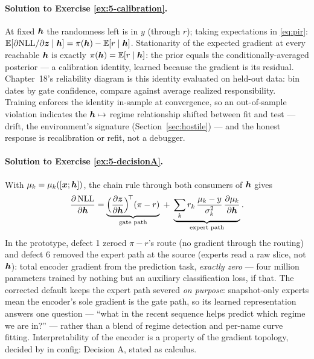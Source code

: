 \paragraph{Solution to Exercise \ref{ex:5-calibration}.}
At fixed $\bm{h}$ the randomness left is in $y$ (through $r$); taking
expectations in \eqref{eq:pir}: $\mathbb{E}[\partial \mathrm{NLL}/\partial \bm{z} \mid
\bm{h}] = \pi(\bm{h}) - \mathbb{E}[r \mid \bm{h}]$. Stationarity of the expected
gradient at every reachable $\bm{h}$ is exactly $\pi(\bm{h}) = \mathbb{E}[r \mid
\bm{h}]$: the prior equals the conditionally-averaged posterior --- a
calibration identity, learned because the gradient is its residual.
Chapter~18's reliability diagram is this identity evaluated on held-out
data: bin dates by gate confidence, compare against average realized
responsibility. Training enforces the identity in-sample at
convergence, so an out-of-sample violation indicates the
$\bm{h} \mapsto$ regime relationship shifted between fit and test ---
drift, the environment's signature (Section~\ref{sec:hostile}) --- and
the honest response is recalibration or refit, not a debugger.

\paragraph{Solution to Exercise \ref{ex:5-decisionA}.}
With $\mu_k = \mu_k([\bm{x}; \bm{h}])$, the chain rule through both consumers
of $\bm{h}$ gives
\[
  \frac{\partial\,\mathrm{NLL}}{\partial \bm{h}}
  = \underbrace{\Bigl(\frac{\partial \bm{z}}{\partial \bm{h}}\Bigr)^{\!\top}
    (\pi - r)}_{\text{gate path}}
  \;+\;
  \underbrace{\sum_k r_k\, \frac{\mu_k - y}{\sigma_k^2}\,
    \frac{\partial \mu_k}{\partial \bm{h}}}_{\text{expert path}} .
\]
In the prototype, defect 1 zeroed $\pi - r$'s route (no gradient through
the routing) and defect 6 removed the expert path at the source (experts
read a raw slice, not $\bm{h}$): total encoder gradient from the prediction
task, \emph{exactly zero} --- four million parameters trained by nothing
but an auxiliary classification loss, if that. The corrected default
keeps the expert path severed \emph{on purpose}: snapshot-only experts
mean the encoder's sole gradient is the gate path, so its learned
representation answers one question --- ``what in the recent sequence
helps predict which regime we are in?'' --- rather than a blend of
regime detection and per-name curve fitting. Interpretability of the
encoder is a property of the gradient topology, decided by
 in config: Decision A, stated as calculus.

